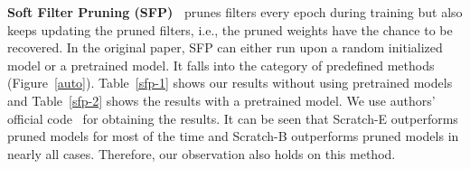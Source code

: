 \textbf{Soft Filter Pruning (SFP)~\cite{he2018sfp}} prunes filters every epoch during training but also keeps updating the pruned filters, i.e., the pruned weights have the chance to be recovered. In the original paper, SFP can either run upon a random initialized model or a pretrained model. It falls into the category of predefined methods (Figure~\ref{auto}). Table~\ref{sfp-1} shows our results without using pretrained models and Table~\ref{sfp-2} shows the results with a pretrained model. We use authors' official code~\cite{he2018sfp} for obtaining the results. It can be seen that Scratch-E outperforms pruned models for most of the time and Scratch-B outperforms pruned models in nearly all cases. Therefore, our observation also holds on this method.

\setlength{\tabcolsep}{4pt}
\renewcommand{\arraystretch}{1.25}
